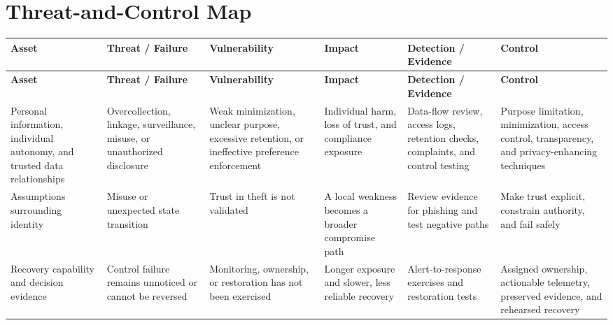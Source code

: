 \documentclass[11pt,letterpaper]{article}
\begin{document}
\section*{Threat-and-Control Map}
\begingroup\scriptsize\setlength{\tabcolsep}{2pt}
\begin{longtable}{>{\raggedright\arraybackslash}p{}>{\raggedright\arraybackslash}p{}>{\raggedright\arraybackslash}p{}>{\raggedright\arraybackslash}p{}>{\raggedright\arraybackslash}p{}>{\raggedright\arraybackslash}p{}}
\toprule\rowcolor{Navy}\color{white}\textbf{Asset} & \color{white}\textbf{Threat / Failure} & \color{white}\textbf{Vulnerability} & \color{white}\textbf{Impact} & \color{white}\textbf{Detection / Evidence} & \color{white}\textbf{Control}\\\midrule
\endfirsthead
\toprule\rowcolor{Navy}\color{white}\textbf{Asset} & \color{white}\textbf{Threat / Failure} & \color{white}\textbf{Vulnerability} & \color{white}\textbf{Impact} & \color{white}\textbf{Detection / Evidence} & \color{white}\textbf{Control}\\\midrule
\endhead
Personal information, individual autonomy, and trusted data relationships & Overcollection, linkage, surveillance, misuse, or unauthorized disclosure & Weak minimization, unclear purpose, excessive retention, or ineffective preference enforcement & Individual harm, loss of trust, and compliance exposure & Data-flow review, access logs, retention checks, complaints, and control testing & Purpose limitation, minimization, access control, transparency, and privacy-enhancing techniques\\\midrule
Assumptions surrounding identity & Misuse or unexpected state transition & Trust in theft is not validated & A local weakness becomes a broader compromise path & Review evidence for phishing and test negative paths & Make trust explicit, constrain authority, and fail safely\\\midrule
Recovery capability and decision evidence & Control failure remains unnoticed or cannot be reversed & Monitoring, ownership, or restoration has not been exercised & Longer exposure and slower, less reliable recovery & Alert-to-response exercises and restoration tests & Assigned ownership, actionable telemetry, preserved evidence, and rehearsed recovery\\\midrule
\bottomrule
\end{longtable}
\endgroup
\end{document}

